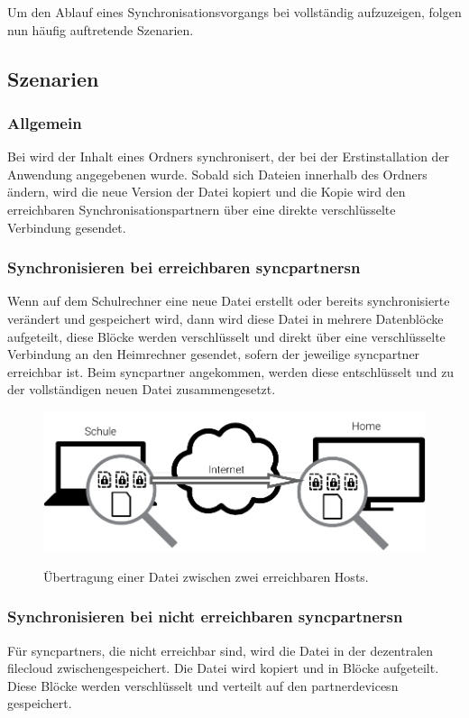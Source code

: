 Um den Ablauf eines Synchronisationsvorgangs bei \sblit vollständig aufzuzeigen,
folgen nun häufig auftretende Szenarien.

\subsection{Szenarien}
\subsubsection{Allgemein}
Bei \sblit wird der Inhalt eines Ordners synchronisert, der bei der
Erstinstallation der Anwendung angegebenen wurde. Sobald sich Dateien innerhalb des Ordners
ändern, wird die neue Version der Datei kopiert und die Kopie wird den
erreichbaren Synchronisationspartnern über eine direkte verschlüsselte Verbindung
gesendet.

\subsubsection{Synchronisieren bei erreichbaren \glspl{syncpartner}n}
Wenn auf dem Schulrechner eine neue Datei erstellt oder bereits synchronisierte verändert und
gespeichert wird, dann wird diese Datei in mehrere Datenblöcke
aufgeteilt, diese Blöcke werden verschlüsselt und direkt über eine verschlüsselte
Verbindung an den Heimrechner gesendet, sofern der jeweilige \gls{syncpartner}
erreichbar ist. Beim \gls{syncpartner} angekommen, werden diese
entschlüsselt und zu der vollständigen neuen Datei zusammengesetzt.

\begin{figure}[htb]
	\centering
  \includegraphics[]{images/sblit_p2p}
	\label{sblit_p2p}
  \caption{Übertragung einer Datei zwischen zwei erreichbaren Hosts.}
\end{figure}

\subsubsection{Synchronisieren bei nicht erreichbaren \glspl{syncpartner}n}
Für \glspl{syncpartner}, die nicht erreichbar sind, wird die Datei in der dezentralen
\gls{filecloud} zwischengespeichert. Die Datei wird kopiert und in Blöcke
aufgeteilt. Diese Blöcke werden verschlüsselt und verteilt auf den
\glspl{partnerdevice}n gespeichert.

